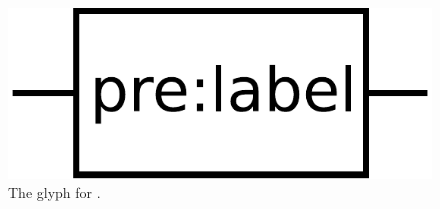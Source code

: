 \begin{figure}[H]
  \centering
  \includegraphics[scale = 0.3]{images/unitInformation}
  \caption{The \ER glyph for .}
  \label{fig:unitInfo}
\end{figure}

\normalcolor
